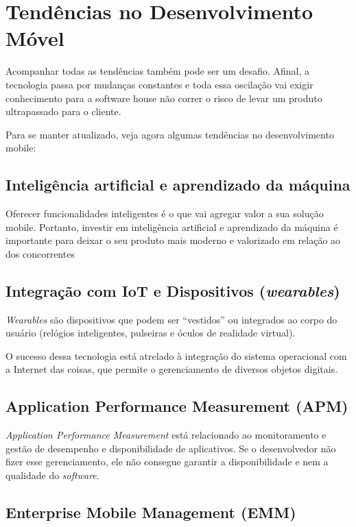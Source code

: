\section{Tendências no Desenvolvimento Móvel}

Acompanhar todas as tendências também pode ser um desafio. Afinal, a tecnologia passa por mudanças constantes e toda essa oscilação vai exigir conhecimento para a software house não correr o risco de levar um produto ultrapassado para o cliente.

Para se manter atualizado, veja agora algumas tendências no desenvolvimento mobile:

\subsection{Inteligência artificial e aprendizado da máquina}

Oferecer funcionalidades inteligentes é o que vai agregar valor a sua solução mobile. Portanto, investir em inteligência artificial e aprendizado da máquina é importante para deixar o seu produto mais moderno e valorizado em relação ao dos concorrentes

\subsection{Integração com IoT e Dispositivos (\textit{wearables})}

\textit{Wearables} são dispositivos que podem ser “vestidos” ou integrados ao corpo do usuário (relógios inteligentes, pulseiras e óculos de realidade virtual).

O sucesso dessa tecnologia está atrelado à integração do sistema operacional com a Internet das coisas, que permite o gerenciamento de diversos objetos digitais.

\subsection{Application Performance Measurement (APM)}

\textit{Application Performance Measurement} está relacionado ao monitoramento e gestão de desempenho e disponibilidade de aplicativos. Se o desenvolvedor não fizer esse gerenciamento, ele não consegue garantir a disponibilidade e nem a qualidade do \textit{software}.

\subsection{Enterprise Mobile Management (EMM)}

